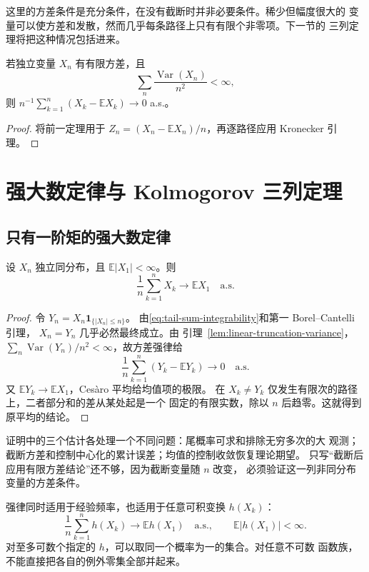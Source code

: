 这里的方差条件是充分条件，在没有截断时并非必要条件。稀少但幅度很大的
变量可以使方差和发散，然而几乎每条路径上只有有限个非零项。下一节的
三列定理将把这种情况包括进来。

\begin{corollary}[方差判据下的强大数定律]
\label{cor:variance-strong-law}
若独立变量 $X_n$ 有有限方差，且
\[
 \sum_n\frac{\operatorname{Var}(X_n)}{n^2}<\infty,
\]
则 $n^{-1}\sum_{k=1}^n(X_k-\mathbb E X_k)\to0$ a.s.。
\end{corollary}

\begin{proof}
将前一定理用于 $Z_n=(X_n-\mathbb E X_n)/n$，再逐路径应用
Kronecker 引理。
\end{proof}

\section{强大数定律与 Kolmogorov 三列定理}
\label{sec:strong-law-three-series}

\subsection{只有一阶矩的强大数定律}

\begin{theorem}
\label{thm:iid-strong-law}
设 $X_n$ 独立同分布，且 $\mathbb E|X_1|<\infty$。则
\[
 \frac1n\sum_{k=1}^nX_k\longrightarrow\mathbb E X_1
 \quad\text{a.s.}
\]
\end{theorem}

\begin{proof}
令 $Y_n=X_n\mathbf1_{\{|X_n|\le n\}}$。
由\eqref{eq:tail-sum-integrability}和第一 Borel--Cantelli 引理，
$X_n=Y_n$ 几乎必然最终成立。由
引理~\ref{lem:linear-truncation-variance}，
$\sum_n\operatorname{Var}(Y_n)/n^2<\infty$，故方差强律给
\[
 \frac1n\sum_{k=1}^n(Y_k-\mathbb E Y_k)\longrightarrow0\quad\text{a.s.}
\]
又 $\mathbb E Y_k\to\mathbb E X_1$，Cesàro 平均给均值项的极限。
在 $X_k\ne Y_k$ 仅发生有限次的路径上，二者部分和的差从某处起是一个
固定的有限实数，除以 $n$ 后趋零。这就得到原平均的结论。
\end{proof}

证明中的三个估计各处理一个不同问题：尾概率可求和排除无穷多次的大
观测；截断方差和控制中心化的累计误差；均值的控制收敛恢复理论期望。
只写“截断后应用有限方差结论”还不够，因为截断变量随 $n$ 改变，
必须验证这一列非同分布变量的方差条件。

强律同时适用于经验频率，也适用于任意可积变换 $h(X_k)$：
\[
 \frac1n\sum_{k=1}^nh(X_k)\longrightarrow\mathbb E h(X_1)
 \quad\text{a.s.},\qquad \mathbb E|h(X_1)|<\infty.
\]
对至多可数个指定的 $h$，可以取同一个概率为一的集合。对任意不可数
函数族，不能直接把各自的例外零集全部并起来。

